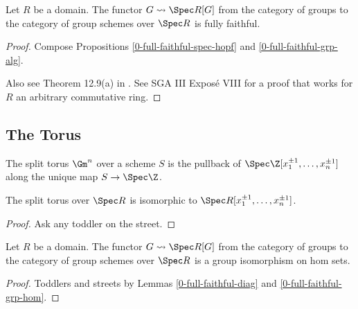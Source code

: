 \begin{theorem}
  \label{0-full-faithful-diag}
  \leanok

  Let $R$ be a domain.
  The functor $G \rightsquigarrow \Spec R[G]$ from the category of groups to the category of group schemes over $\Spec R$ is fully faithful.
\end{theorem}
\begin{proof}
  \leanok

  Compose Propositions \ref{0-full-faithful-spec-hopf} and \ref{0-full-faithful-grp-alg}.

  Also see Theorem 12.9(a) in \cite{Milne_2017}. See SGA III Exposé VIII for a proof that works for $R$ an arbitrary commutative ring.
\end{proof}


\subsection{The Torus}


\begin{definition}
  \label{0-torus}
  \leanok

  The split torus $\Gm^n$ over a scheme $S$ is the pullback of
  $\Spec \Z[x_1^{\pm 1}, \dotsc, x_n^{\pm 1}]$ along the unique map $S \to \Spec \Z$.
\end{definition}


\begin{lemma}
  \label{0-torus-spec}
  \leanok

  The split torus over $\Spec R$ is isomorphic to $\Spec R[x_1^{\pm 1}, \dotsc, x_n^{\pm 1}]$.
\end{lemma}
\begin{proof}
  \uses{}

  Ask any toddler on the street.
\end{proof}


\begin{lemma}
  \label{0-diag-hom}

  Let $R$ be a domain.
  The functor $G \rightsquigarrow \Spec R[G]$ from the category of groups to the category of group schemes over $\Spec R$ is a group isomorphism on hom sets.
\end{lemma}
\begin{proof}

  Toddlers and streets by Lemmas \ref{0-full-faithful-diag} and \ref{0-full-faithful-grp-hom}.
\end{proof}


